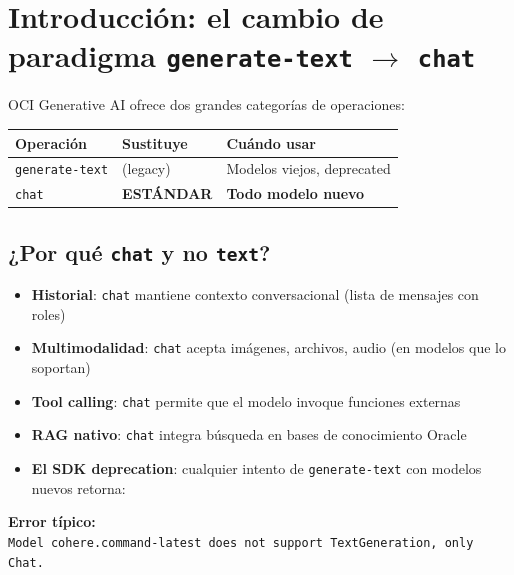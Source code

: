 \documentclass[11pt,a4paper,oneside]{article}
\begin{document}
\vspace{1em}

\section{Introducción: el cambio de paradigma \texttt{generate-text} $\rightarrow$ \texttt{chat}}

OCI Generative AI ofrece dos grandes categorías de operaciones:

\begin{center}
\begin{tabular}{@{}lll@{}}
\toprule
\textbf{Operación} & \textbf{Sustituye} & \textbf{Cuándo usar} \\
\midrule
\rowcolor{gray!10}
\texttt{generate-text} & (legacy) & Modelos viejos, deprecated \\
\texttt{chat} & \textbf{ESTÁNDAR} & \textbf{Todo modelo nuevo} \\
\bottomrule
\end{tabular}
\end{center}

\subsection{¿Por qué \texttt{chat} y no \texttt{text}?}

\begin{itemize}
  \item \textbf{Historial}: \texttt{chat} mantiene contexto conversacional (lista de mensajes con roles)
  \item \textbf{Multimodalidad}: \texttt{chat} acepta imágenes, archivos, audio (en modelos que lo soportan)
  \item \textbf{Tool calling}: \texttt{chat} permite que el modelo invoque funciones externas
  \item \textbf{RAG nativo}: \texttt{chat} integra búsqueda en bases de conocimiento Oracle
  \item \textbf{El SDK deprecation}: cualquier intento de \texttt{generate-text} con modelos nuevos retorna:
\end{itemize}

\begin{tcolorbox}[colback=errred!5!white,colframe=errred]
\textbf{Error típico:} \\
\texttt{Model cohere.command-latest does not support TextGeneration, only Chat.}
\end{tcolorbox}
\end{document}
